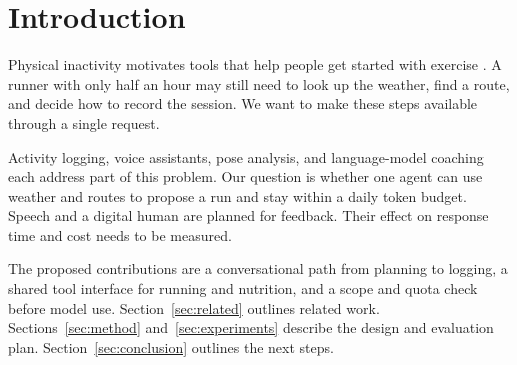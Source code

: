 \section{Introduction}\label{sec:intro}
Physical inactivity motivates tools that help people get started with exercise \cite{who_pa}. A runner with only half an hour may still need to look up the weather, find a route, and decide how to record the session. We want to make these steps available through a single request.

Activity logging, voice assistants, pose analysis, and language-model coaching each address part of this problem. Our question is whether one agent can use weather and routes to propose a run and stay within a daily token budget. Speech and a digital human are planned for feedback. Their effect on response time and cost needs to be measured.

The proposed contributions are a conversational path from planning to logging, a shared tool interface for running and nutrition, and a scope and quota check before model use. Section~\ref{sec:related} outlines related work. Sections~\ref{sec:method} and~\ref{sec:experiments} describe the design and evaluation plan. Section~\ref{sec:conclusion} outlines the next steps.

